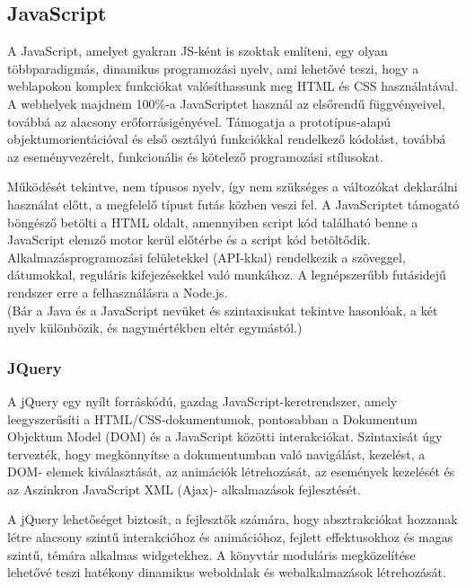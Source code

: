 \subsection{JavaScript}

A JavaScript, amelyet gyakran JS-ként is szoktak említeni, egy olyan többparadigmás, dinamikus programozási nyelv, ami lehetővé teszi, hogy a weblapokon komplex funkciókat valósíthassunk meg HTML és CSS használatával. A webhelyek majdnem 100\%-a JavaScriptet használ az elsőrendű függvényeivel, továbbá az alacsony erőforrásigényével. Támogatja a prototípus-alapú objektumorientációval és első osztályú funkciókkal rendelkező kódolást, továbbá az eseményvezérelt, funkcionális és kötelező programozási stílusokat. 

Működését tekintve, nem típusos nyelv, így nem szükséges a változókat deklarálni használat előtt, a megfelelő típust futás közben veszi fel. A JavaScriptet támogató böngésző betölti a HTML oldalt, amennyiben script kód található benne a JavaScript elemző motor kerül előtérbe és a script kód betöltődik. Alkalmazásprogramozási felületekkel (API-kkal) rendelkezik a szöveggel, dátumokkal, reguláris kifejezésekkel való munkához. A legnépszerűbb futásidejű rendszer erre a felhasználásra a Node.js. \\
(Bár a Java és a JavaScript nevüket és szintaxisukat tekintve hasonlóak, a két nyelv különbözik, és nagymértékben eltér egymástól.)  \cite{wikiJS}


\subsubsection{JQuery}

A jQuery egy nyílt forráskódú, gazdag JavaScript-keretrendszer, amely leegyszerűsíti a HTML/CSS-dokumentumok, pontosabban a Dokumentum Objektum Model (DOM) és a JavaScript közötti interakciókat. Szintaxisát úgy tervezték, hogy megkönnyítse a dokumentumban való navigálást, kezelést, a DOM- elemek kiválasztását, az animációk létrehozását, az események kezelését és az Aszinkron JavaScript XML (Ajax)- alkalmazások fejlesztését.

	 A jQuery lehetőséget biztosít, a fejlesztők számára, hogy absztrakciókat hozzanak létre alacsony szintű interakcióhoz és animációhoz, fejlett effektusokhoz és magas szintű, témára alkalmas widgetekhez. A könyvtár moduláris megközelítése lehetővé teszi hatékony dinamikus weboldalak és webalkalmazások létrehozását. \\

